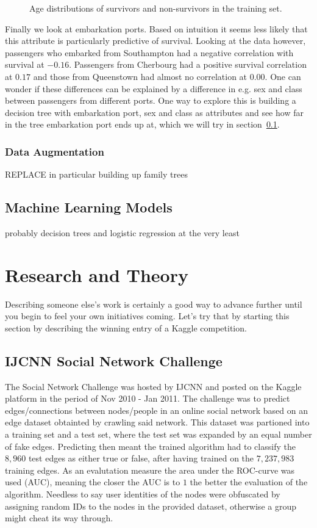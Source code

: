 \documentclass[english, a4paper]{article}
\begin{document}
\begin{figure}[H]
\begin{subfigure}{.5\textwidth}
    \end{subfigure}
    \caption{Age distributions of survivors and non-survivors in the training set.}
    \label{fig:survivor_split_age_histograms}
\end{figure}
\noindent
Finally we look at embarkation ports. Based on intuition it seems less likely that this attribute is particularly predictive of survival. Looking at the data however, passengers who embarked from Southampton had a negative correlation with survival at $-0.16$. Passengers from Cherbourg had a positive survival correlation at $0.17$ and those from Queenstown had almost no correlation at $0.00$. One can wonder if these differences can be explained by a difference in e.g. sex and class between passengers from different ports. One way to explore this is building a decision tree with embarkation port, sex and class as attributes and see how far in the tree embarkation port ends up at, which we will try in section~\ref{subsec:titanic_machine_learning_models}.
\subsubsection{Data Augmentation}
REPLACE in particular building up family trees
\subsection{Machine Learning Models}
\label{subsec:titanic_machine_learning_models}
probably decision trees and logistic regression at the very least

\section{Research and Theory}
Describing someone else's work is certainly a good way to advance further until you begin to feel your own initiatives coming. Let's try that by starting this section by describing the winning entry of a Kaggle competition.  
\subsection{IJCNN Social Network Challenge}
The Social Network Challenge was hosted by IJCNN and posted on the Kaggle platform in the period of Nov 2010 - Jan 2011. The challenge was to predict edges/connections between nodes/people in an online social network based on an edge dataset obtainted by crawling said network. This dataset was partioned into a training set and a test set, where the test set was expanded by an equal number of fake edges. Predicting then meant the trained algorithm had to classify the $8,960$ test edges as either true or false, after having trained on the $7,237,983$ training edges. As an evalutation measure the area under the ROC-curve was used (AUC), meaning the closer the AUC is to $1$ the better the evaluation of the algorithm. Needless to say user identities of the nodes were obfuscated by assigning random IDs to the nodes in the provided dataset, otherwise a group might cheat its way through.
\end{document}
